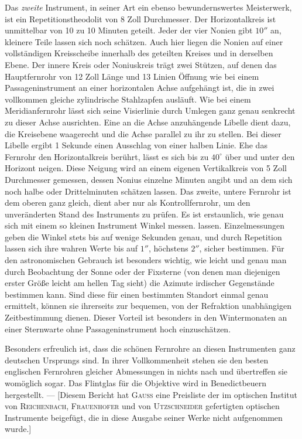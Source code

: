 \par\indent Das \emph{zweite} Instrument, in seiner Art ein ebenso bewundernswertes Meisterwerk, ist ein Repetitionstheodolit von 8 Zoll Durchmesser. Der Horizontalkreis ist unmittelbar von 10 zu 10 Minuten geteilt. Jeder der vier Nonien gibt $10''$ an, kleinere Teile lassen sich noch schätzen. Auch hier liegen die Nonien auf einer vollständigen Kreisscheibe innerhalb des geteilten Kreises und in derselben Ebene. Der innere Kreis oder Noniuskreis trägt zwei Stützen, auf denen das Hauptfernrohr von 12 Zoll Länge und 13 Linien Öffnung wie bei einem Passageninstrument an einer horizontalen Achse aufgehängt ist, die in zwei vollkommen gleiche zylindrische Stahlzapfen ausläuft. Wie bei einem Meridianfernrohr lässt sich seine Visierlinie durch Umlegen ganz genau senkrecht zu dieser Achse ausrichten. Eine an die Achse anzuhängende Libelle dient dazu, die Kreisebene waagerecht und die Achse parallel zu ihr zu stellen. Bei dieser Libelle ergibt 1 Sekunde einen Ausschlag von einer halben Linie. Ehe das Fernrohr den Horizontalkreis berührt, lässt es sich bis zu $40^\circ$ über und unter den Horizont neigen. Diese Neigung wird an einem eigenen Vertikalkreis von 5 Zoll Durchmesser gemessen, dessen Nonius einzelne Minuten angibt und an dem sich noch halbe oder Drittelminuten schätzen lassen. Das zweite, untere Fernrohr ist dem oberen ganz gleich, dient aber nur als Kontrollfernrohr, um den unveränderten Stand des Instruments zu prüfen. Es ist erstaunlich, wie genau sich mit einem so kleinen Instrument Winkel messen. lassen. Einzelmessungen geben die Winkel stets bis auf wenige Sekunden genau, und durch Repetition lassen sich ihre wahren Werte bis auf $1''$, höchstens $2''$, sicher bestimmen. Für den astronomischen Gebrauch ist besonders wichtig, wie leicht und genau man durch Beobachtung der Sonne oder der Fixsterne (von denen man diejenigen erster Größe leicht am hellen Tag sieht) die Azimute irdischer Gegenstände bestimmen kann. Sind diese für einen bestimmten Standort einmal genau ermittelt, können sie ihrerseits zur bequemen, von der Refraktion unabhängigen Zeitbestimmung dienen. Dieser Vorteil ist besonders in den Wintermonaten an einer Sternwarte ohne Passageninstrument hoch einzuschätzen.

\par{}\indent Besonders erfreulich ist, dass die schönen Fernrohre an diesen Instrumenten ganz deutschen Ursprungs sind. In ihrer Vollkommenheit stehen sie den besten englischen Fernrohren gleicher Abmessungen in nichts nach und übertreffen sie womöglich sogar. Das Flintglas für die Objektive wird in Benedictbeuern hergestellt. --- [Diesem Bericht hat \textsc{Gauss} eine Preisliste der im optischen Institut von \textsc{Reichenbach}, \textsc{Frauenhofer} und von \textsc{Utzschneider} gefertigten optischen Instrumente beigefügt, die in diese Ausgabe seiner Werke nicht aufgenommen wurde.]
